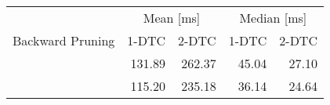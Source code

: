\begin{tabular}{crrrr}
	\toprule
	                 & \multicolumn{2}{c}{Mean [\si{\milli\second}]} & \multicolumn{2}{c}{Median [\si{\milli\second}]}                 \\
	Backward Pruning & 1-DTC                                         & 2-DTC                                           & 1-DTC & 2-DTC \\
	\midrule
	\xmark           & 131.89                                             & 262.37                                               & 45.04     & 27.10     \\
	\cmark           & 115.20                                             & 235.18                                               & 36.14     & 24.64     \\
	\bottomrule
\end{tabular}
